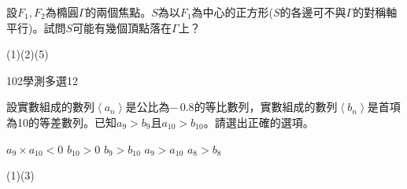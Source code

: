 \begin{QUESTIONS}
\begin{QUESTION}
\begin{ExamAnsRateInfo}{42}{58}{45}{23}
        \end{ExamAnsRateInfo}
        \begin{QBODY}
			設${{F}_{1}},{{F}_{2}}$為橢圓$\Gamma $的兩個焦點。$S$為以${{F}_{1}}$為中心的正方形($S$的各邊可不與$\Gamma $的對稱軸平行)。試問$S$可能有幾個頂點落在$\Gamma $上？
			\begin{QOPS}
			\end{QOPS}
        \end{QBODY}
        \begin{QFROMS}
        \end{QFROMS}
        \begin{QTAGS}\end{QTAGS}
        \begin{QANS}
            (1)(2)(5)
        \end{QANS}
        \begin{QSOLLIST}
        \end{QSOLLIST}
        \begin{QEMPTYSPACE}
        \end{QEMPTYSPACE}
    \end{QUESTION}
    \begin{QUESTION}
        \begin{ExamInfo}{102}{學測}{多選}{12}
        \end{ExamInfo}
        \begin{ExamAnsRateInfo}{45}{67}{46}{22}
        \end{ExamAnsRateInfo}
        \begin{QBODY}
			設實數組成的數列$\left\langle {{a}_{n}} \right\rangle $是公比為$-\,0.8$的等比數列，實數組成的數列$\left\langle {{b}_{n}} \right\rangle $是首項為10的等差數列。已知${{a}_{9}}>{{b}_{9}}$且${{a}_{10}}>{{b}_{10}}$。請選出正確的選項。
			\begin{QOPS}
				\QOP ${{a}_{9}}\times {{a}_{10}}<0$
				\QOP ${{b}_{10}}>0$
				\QOP ${{b}_{9}}>{{b}_{10}}$
				\QOP ${{a}_{9}}>{{a}_{10}}$
				\QOP ${{a}_{8}}>{{b}_{8}}$
			\end{QOPS}
        \end{QBODY}
        \begin{QFROMS}
        \end{QFROMS}
        \begin{QTAGS}\end{QTAGS}
        \begin{QANS}
            (1)(3)
        \end{QANS}
        \begin{QSOLLIST}
        \end{QSOLLIST}
        \begin{QEMPTYSPACE}
        \end{QEMPTYSPACE}
    \end{QUESTION}
\end{QUESTIONS}
